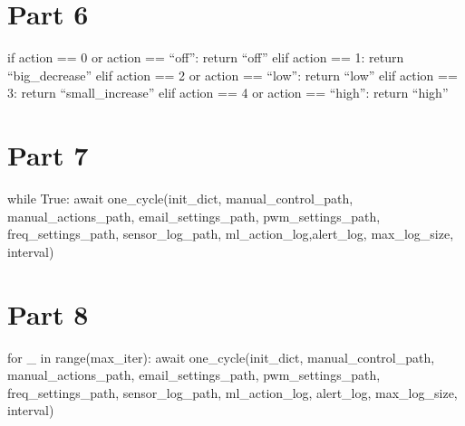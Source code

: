 \documentclass[
]{article}
\begin{document}
\hypertarget{part-6}{%
\section{Part 6}\label{part-6}}

if action == 0 or action == ``off'': return ``off'' elif action == 1:
return ``big\_decrease'' elif action == 2 or action == ``low'': return
``low'' elif action == 3: return ``small\_increase'' elif action == 4 or
action == ``high'': return ``high''

\hypertarget{part-7}{%
\section{Part 7}\label{part-7}}

while True: await one\_cycle(init\_dict, manual\_control\_path,
manual\_actions\_path, email\_settings\_path, pwm\_settings\_path,
freq\_settings\_path, sensor\_log\_path, ml\_action\_log,alert\_log,
max\_log\_size, interval)

\hypertarget{part-8}{%
\section{Part 8}\label{part-8}}

for \_ in range(max\_iter): await one\_cycle(init\_dict,
manual\_control\_path, manual\_actions\_path, email\_settings\_path,
pwm\_settings\_path, freq\_settings\_path, sensor\_log\_path,
ml\_action\_log, alert\_log, max\_log\_size, interval)
\end{document}
